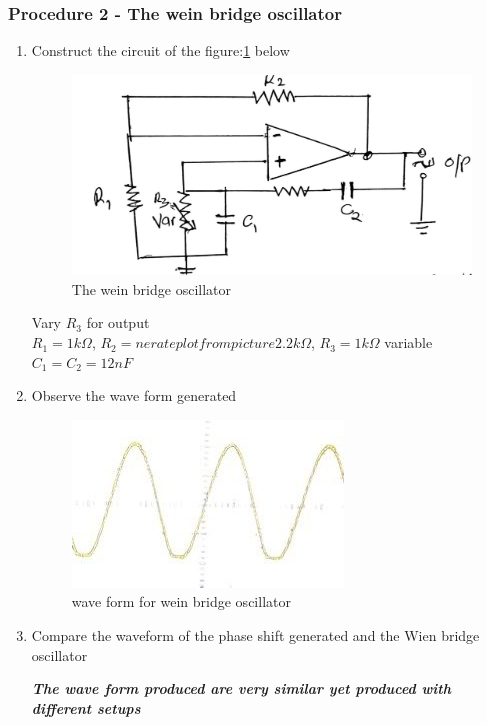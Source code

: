 \documentclass[12pt,a4paper]{article}
\begin{document}
    \subsubsection{Procedure 2 - The wein bridge oscillator}

    \begin{enumerate}
        \item Construct the circuit of the figure:\ref{fig:2} below
        \begin{figure}[H]
            \centering
            \includegraphics[width=0.5\linewidth]{circuit2_2.jpeg}
            \caption{The wein bridge oscillator}
            \label{fig:2}
        \end{figure}
        Vary $R_3$ for output\\
        $R_1 = 1k \Omega$, $R_2 = nerate plot from picture2.2k \Omega$, $R_3 = 1k \Omega$ variable\\
        $ C_1 = C_2 = 12nF$
        \item Observe the wave form generated
        \begin{figure}[H]
            \centering
            \includegraphics[width=0.5\linewidth]{2.jpeg}
            \caption{wave form for wein bridge oscillator}
            \label{fig:enter-label}
        \end{figure}
        \item Compare the waveform of the phase shift generated and the Wien bridge oscillator
        
        \textbf{\textit{The wave form produced are very similar yet produced with different setups}}
    \end{enumerate}
\end{document}
